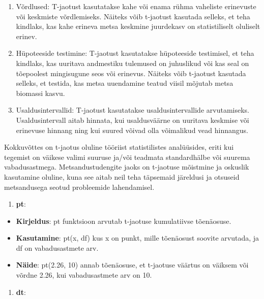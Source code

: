 \documentclass[
]{book}
\providecommand{\tightlist}{%
  \setlength{\itemsep}{0pt}\setlength{\parskip}{0pt}}
\begin{document}
\begin{enumerate}
\def\labelenumi{\arabic{enumi}.}
\item
  Võrdlused: T-jaotust kasutatakse kahe või enama rühma vaheliste erinevuste või keskmiste võrdlemiseks. Näiteks võib t-jaotust kasutada selleks, et teha kindlaks, kas kahe erineva metsa keskmine juurdekasv on statistiliselt oluliselt erinev.
\item
  Hüpoteeside testimine: T-jaotust kasutatakse hüpoteeside testimisel, et teha kindlaks, kas uuritava andmestiku tulemused on juhuslikud või kas seal on tõepoolest mingisugune seos või erinevus. Näiteks võib t-jaotust kasutada selleks, et testida, kas metsa uuendamine teatud viisil mõjutab metsa biomassi kasvu.
\item
  Usaldusintervallid: T-jaotust kasutatakse usaldusintervallide arvutamiseks. Usaldusintervall aitab hinnata, kui usaldusväärne on uuritava keskmise või erinevuse hinnang ning kui suured võivad olla võimalikud vead hinnangus.
\end{enumerate}

Kokkuvõttes on t-jaotus oluline tööriist statistilistes analüüsides, eriti kui tegemist on väikese valimi suuruse ja/või teadmata standardhälbe või suurema vabadusastmega. Metsandustudengite jaoks on t-jaotuse mõistmine ja oskuslik kasutamine oluline, kuna see aitab neil teha täpsemaid järeldusi ja otsuseid metsandusega seotud probleemide lahendamisel.

\begin{enumerate}
\def\labelenumi{\arabic{enumi}.}
\tightlist
\item
  \textbf{pt}:
\end{enumerate}

\begin{itemize}
\tightlist
\item
  \textbf{Kirjeldus}: pt funktsioon arvutab t-jaotuse kumulatiivse tõenäosuse.
\item
  \textbf{Kasutamine}: pt(x, df) kus x on punkt, mille tõenäosust soovite arvutada, ja df on vabadusastmete arv.
\item
  \textbf{Näide}: pt(2.26, 10) annab tõenäosuse, et t-jaotuse väärtus on väiksem või võrdne 2.26, kui vabadusastmete arv on 10.
\end{itemize}

\begin{enumerate}
\def\labelenumi{\arabic{enumi}.}
\setcounter{enumi}{1}
\tightlist
\item
  \textbf{dt}:
\end{enumerate}
\end{document}
